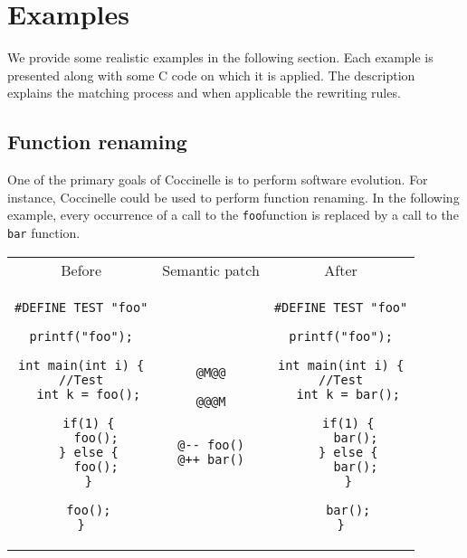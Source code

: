 
\section{Examples}

We provide some realistic examples in the following section.  Each
example is presented along with some C code on which it is
applied. The description explains the matching process and when
applicable the rewriting rules.

\subsection{Function renaming}

One of the primary goals of Coccinelle is to perform software
evolution.  For instance, Coccinelle could be used to perform function
renaming. In the following example, every occurrence of a call to the
\texttt{foo}function is replaced by a call to the \texttt{bar}
function.\\

\begin{tabular}{ccc}
Before & Semantic patch & After \\
\begin{minipage}[t]{.3\linewidth}
\begin{lstlisting}
#DEFINE TEST "foo"

printf("foo");

int main(int i) {
//Test
  int k = foo();

  if(1) {
    foo();
  } else {
    foo();
  }

  foo();
}
\end{lstlisting}
\end{minipage}
&
\begin{minipage}[t]{.3\linewidth}
\begin{lstlisting}[language=Cocci]
@M@@

@@@M


@-- foo()
@++ bar()
\end{lstlisting}
\end{minipage}
&
\begin{minipage}[t]{.3\linewidth}
\begin{lstlisting}
#DEFINE TEST "foo"

printf("foo");

int main(int i) {
//Test
  int k = bar();

  if(1) {
    bar();
  } else {
    bar();
  }

  bar();
}
\end{lstlisting}
\end{minipage}\\
\end{tabular}

